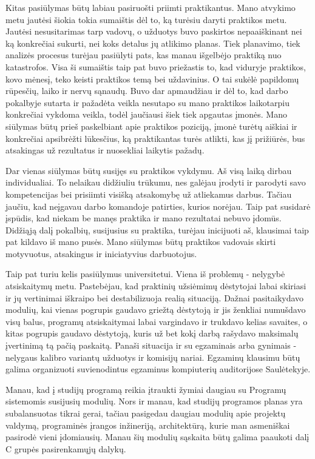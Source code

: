 \documentclass{VUMIFPSkursinis}
\begin{document}
Kitas pasiūlymas būtų labiau pasiruošti priimti praktikantus. Mano atvykimo metu jautėsi šiokia tokia sumaištis dėl to, ką turėsiu daryti praktikos metu. Jautėsi nesusitarimas tarp vadovų, o užduotys buvo paskirtos nepaaiškinant nei ką konkrečiai sukurti, nei koks detalus jų atlikimo planas. Tiek planavimo, tiek analizės procesus turėjau pasiūlyti pats, kas manau išgelbėjo praktiką nuo katastrofos. Visa ši sumaištis taip pat buvo priežastis to, kad viduryje praktikos, kovo mėnesį, teko keisti praktikos temą bei uždavinius. O tai sukėlė papildomų rūpesčių, laiko ir nervų sąnaudų. Buvo dar apmaudžiau ir dėl to, kad darbo pokalbyje sutarta ir pažadėta veikla nesutapo su mano praktikos laikotarpiu konkrečiai vykdoma veikla, todėl jaučiausi šiek tiek apgautas įmonės. Mano siūlymas būtų prieš paskelbiant apie praktikos poziciją, įmonė turėtų aiškiai ir konkrečiai apsibrėžti lūkesčius, ką praktikantas turės atlikti, kas jį prižiūrės, bus atsakingas už rezultatus ir nuosekliai laikytis pažadų.

Dar vienas siūlymas būtų susijęs su praktikos vykdymu. Aš visą laiką dirbau individualiai. To nelaikau didžiuliu trūkumu, nes galėjau įrodyti ir parodyti savo kompetencijas bei prisiimti visišką atsakomybę už atliekamus darbus. Tačiau jaučiu, kad neįgavau darbo komandoje patirties, kurios norėjau. Taip pat susidarė įspūdis, kad niekam be manęs praktika ir mano rezultatai nebuvo įdomūs. Didžiąją dalį pokalbių, susijusius su praktika, turėjau inicijuoti aš, klausimai taip pat kildavo iš mano pusės. Mano siūlymas būtų praktikos vadovais skirti motyvuotus, atsakingus ir iniciatyvius darbuotojus.

Taip pat turiu kelis pasiūlymus universitetui. Viena iš problemų - nelygybė atsiskaitymų metu. Pastebėjau, kad praktinių užsiėmimų dėstytojai labai skiriasi ir jų vertinimai iškraipo bei destabilizuoja realią situaciją. Dažnai pasitaikydavo modulių, kai vienas pogrupis gaudavo griežtą dėstytoją ir jis ženkliai numušdavo visų balus, programų atsiskaitymai labai vargindavo ir trukdavo kelias savaites, o kitas pogrupis gaudavo dėstytoją, kuris už bet kokį darbą rašydavo maksimalų įvertinimą tą pačią paskaitą. Panaši situacija ir su egzaminais arba gynimais - nelygaus kalibro variantų užduotys ir komisijų nariai. Egzaminų klausimu būtų galima organizuoti suvienodintus egzaminus kompiuterių auditorijose Saulėtekyje.

Manau, kad į studijų programą reikia įtraukti žymiai daugiau su Programų sistemomis susijusių modulių. Nors ir manau, kad studijų programos planas yra subalansuotas tikrai gerai, tačiau pasigedau daugiau modulių apie projektų valdymą, programinės įrangos inžineriją, architektūrą, kurie man asmeniškai pasirodė vieni įdomiausių. Manau šių modulių sąskaita būtų galima paaukoti dalį C grupės pasirenkamųjų dalykų.
\end{document}
